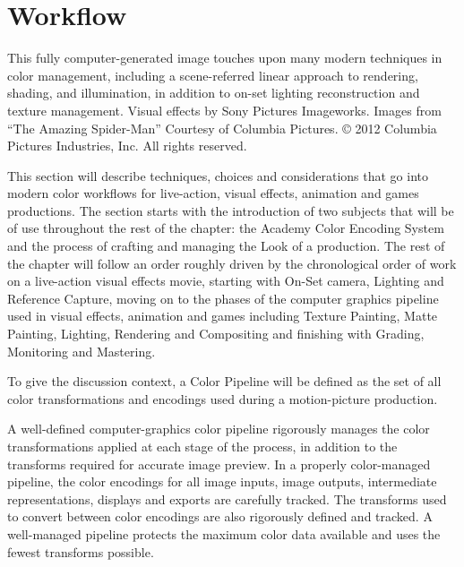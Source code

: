 \chapter{Workflow}

This fully computer-generated image touches upon many modern techniques in color management, including a scene-referred linear approach to rendering, shading, and illumination, in addition to on-set lighting reconstruction and texture management.
Visual effects by Sony Pictures Imageworks. Images from “The Amazing Spider-Man” Courtesy of Columbia Pictures. © 2012 Columbia Pictures Industries, Inc. All rights reserved.

This section will describe techniques, choices and considerations that go into modern color workflows for live-action, visual effects, animation and games productions. The section starts with the introduction of two subjects that will be of use throughout the rest of the chapter: the Academy Color Encoding System and the process of crafting and managing the Look of a production. The rest of the chapter will follow an order roughly driven by the chronological order of work on a live-action visual effects movie, starting with On-Set camera, Lighting and Reference Capture, moving on to the phases of the computer graphics pipeline used in visual effects, animation and games including Texture Painting, Matte Painting, Lighting, Rendering and Compositing and finishing with Grading, Monitoring and Mastering.

To give the discussion context, a Color Pipeline will be defined as the set of all color transformations and encodings used during a motion-picture production.

A well-defined computer-graphics color pipeline rigorously manages the color transformations applied at each stage of the process, in addition to the transforms required for accurate image preview.
In a properly color-managed pipeline, the color encodings for all image inputs, image outputs, intermediate representations, displays and exports are carefully tracked. The transforms used to convert between color encodings are also rigorously defined and tracked. A well-managed pipeline protects the maximum color data available and uses the fewest transforms possible.



















